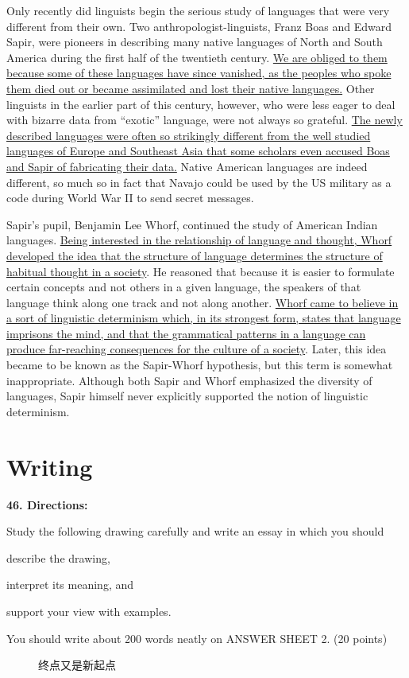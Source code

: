 Only recently did linguists begin the serious study of languages that
were very different from their own. Two anthropologist-linguists, Franz
Boas and Edward Sapir, were pioneers in describing many native languages
of North and South America during the first half of the twentieth
century. \transnum \uline{We are obliged to them because some of these
	languages have since vanished, as the peoples who spoke them died out or
	became assimilated and lost their native languages.} Other linguists in
the earlier part of this century, however, who were less eager to deal
with bizarre data from ``exotic'' language, were not always so grateful.
\transnum \uline{The newly described languages were often so strikingly
	different from the well studied languages of Europe and Southeast Asia
	that some scholars even accused Boas and Sapir of fabricating their
	data.} Native American languages are indeed different, so much so in
fact that Navajo could be used by the US military as a code during World
War II to send secret messages.

Sapir's pupil, Benjamin Lee Whorf, continued the study of American
Indian languages. \transnum \uline{Being interested in the relationship
	of language and thought, Whorf developed the idea that the structure of
	language determines the structure of habitual thought in a society}. He
reasoned that because it is easier to formulate certain concepts and not
others in a given language, the speakers of that language think along
one track and not along another. \transnum \uline{Whorf came to believe
	in a sort of linguistic determinism which, in its strongest form, states
	that language imprisons the mind, and that the grammatical patterns in a
	language can produce far-reaching consequences for the culture of a
	society}. Later, this idea became to be known as the Sapir-Whorf
hypothesis, but this term is somewhat inappropriate. Although both Sapir
and Whorf emphasized the diversity of languages, Sapir himself never
explicitly supported the notion of linguistic determinism.



\section{Writing}


\textbf{46. Directions:}

Study the following drawing carefully and write an essay in
	which you should
\begin{listwrite}
\item 
 describe the drawing,



\item
 interpret its meaning, and



\item
support your view with examples.
\end{listwrite}

You should write about 200 words neatly on ANSWER SHEET 2. (20 points)


\begin{figure}[h!]
	\centering
	
	\caption*{终点又是新起点}
\end{figure}


